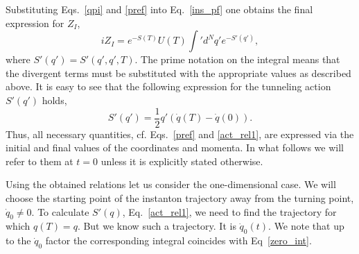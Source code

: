 \documentclass[journal=jpcafh,manuscript=article]{achemso}
\begin{document}
Substituting Eqs.~\ref{qpi} and \ref{pref} into Eq.~\ref{ins_pf} one
obtains the final expression for $Z_{I}$,
\begin{equation}
  \label{ins_pf_res}
  iZ_{I}=e^{-S(T)}U(T) \int' d^N\! q' e^{-S'(q')},
\end{equation}
where $S'(q') = S'(q',q',T)$.  The prime notation on the integral
means that the divergent terms must be substituted with the
appropriate values as described above.  It is easy to see that the
following expression for the tunneling action $S'(q')$ holds,
\begin{equation}
  \label{act_rel1}
  S'(q') = \frac{1}{2}q'(\dot{q}(T)-\dot{q}(0)).
\end{equation}
Thus, all necessary quantities, cf. Eqs.~\ref{pref} and
\ref{act_rel1}, are expressed via the initial and final values of the
coordinates and momenta. In what follows we will refer to them at
$t=0$ unless it is explicitly stated otherwise.

Using the obtained relations let us consider the one-dimensional case.
We will choose the starting point of the instanton trajectory away
from the turning point, $\dot{q}_0 \neq 0$.  To calculate $S'(q)$,
Eq.~\ref{act_rel1}, we need to find the trajectory for which
$q(T) = q$. But we know such a trajectory. It is $\dot{q}_0(t)$. We
note that up to the $\dot{q}_0$ factor the corresponding integral
coincides with Eq~\ref{zero_int}.
\end{document}
